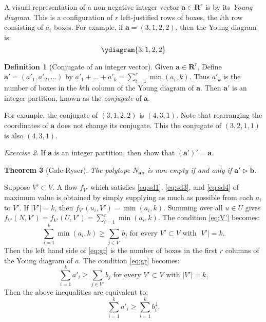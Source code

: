 \documentclass{amsbook}
\newcommand{\bb}{\mathbf b}
\renewcommand{\aa}{\mathbf a}
\newcommand{\RR}{\mathbf R}
\newtheorem{theorem}{Theorem}[section]
\theoremstyle{definition}
\newtheorem{definition}[theorem]{Definition}
\theoremstyle{remark}
\newtheorem{exercise}[theorem]{Exercise}
\begin{document}
A visual representation of a non-negative integer vector $\aa\in \RR^r$ is by its \emph{Young diagram}.
This is a configuration of $r$ left-justified rows of boxes, the $i$th row consisting of $a_i$ boxes.
For example, if $\aa=(3,1,2,2)$, then the Young diagram is:
\begin{displaymath}
  \ydiagram{3,1,2,2}
\end{displaymath}
\begin{definition}
  [Conjugate of an integer vector]
  Given $\aa\in \RR^r$, Define $\aa'=(a'_1,a'_2,\dotsc)$ by $a'_1+\dotsc + a'_k=\sum_{i=1}^r \min(a_i,k)$.
  Thus $a'_k$ is the number of boxes in the $k$th column of the Young diagram of $\aa$.
  Then $\aa'$ is an integer partition, known as the \emph{conjugate} of $\aa$.
\end{definition}
For example, the conjugate of $(3, 1, 2, 2)$ is $(4,3,1)$.
Note that rearranging the coordinates of $\aa$ does not change its conjugate.
This the conjugate of $(3,2,1,1)$ is also $(4,3,1)$.
\begin{exercise}
  If $\aa$ is an integer partition, then show that $(\aa')'=\aa$.
\end{exercise}
\begin{theorem}
  [Gale-Ryser]
  \label{theorem:gale-ryser}
  The polytope $N_{\aa\bb}$ is non-empty if and only if $\aa'\rhd \bb$.
\end{theorem}
Suppose $V'\subset V$.
A flow $f_{V'}$ which satisfies \eqref{eq:sd1}, \eqref{eq:sd3}, and \eqref{eq:sd4} of maximum value is obtained by simply supplying as much as possible from each $a_i$ to $V'$.
If $|V'|=k$, then $f_{V'}(u_i,V')=\min(a_i,k)$.
Summing over all $u\in U$ gives $f_{V'}(N,V')=f_{V'}(U,V')=\sum_{i=1}^r\min(a_i,k)$.
The condition \eqref{eq:V'} becomes:
\begin{equation}
  \label{eq:gr}
  \sum_{i=1}^k \min(a_i,k)\geq \sum_{j\in V'} b_j \text{ for every } V'\subset V \text{ with } |V'|=k.
\end{equation}
Then the left hand side of \eqref{eq:gr} is the number of boxes in the first $r$ columns of the Young diagram of $a$.
The condition \eqref{eq:gr} becomes:
\begin{displaymath}
  \sum_{i=1}^k a'_i \geq \sum_{j\in V'}b_j \text{ for every $V'\subset V$ with $|V'|=k$}.
\end{displaymath}
Then the above inequalities are equivalent to:
\begin{displaymath}
  \sum_{i=1}^k a'_i \geq \sum_{i=1}^k b^{\downarrow}_i.
\end{displaymath}
\end{document}
